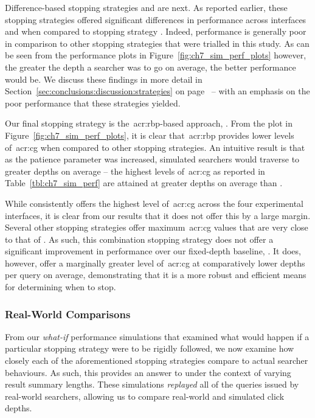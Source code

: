 Difference-based stopping strategies  and  are next. As reported earlier, these stopping strategies offered significant differences in performance across interfaces  and  when compared to stopping strategy . Indeed, performance is generally poor in comparison to other stopping strategies that were trialled in this study. As can be seen from the performance plots in Figure~\ref{fig:ch7_sim_perf_plots} however, the greater the depth a searcher was to go on average, the better performance would be. We discuss these findings in more detail in Section~\ref{sec:conclusions:discussion:strategies} on page~\pageref{sec:conclusions:discussion:strategies} -- with an emphasis on the poor performance that these strategies yielded.

Our final stopping strategy is the~\gls{acr:rbp}-based approach, . From the plot in Figure~\ref{fig:ch7_sim_perf_plots}, it is clear that~\gls{acr:rbp} provides lower levels of~\gls{acr:cg} when compared to other stopping strategies. An intuitive result is that as the patience parameter was increased, simulated searchers would traverse to greater depths on average -- the highest levels of~\gls{acr:cg} as reported in Table~\ref{tbl:ch7_sim_perf} are attained at greater depths on average than .

While  consistently offers the highest level of~\gls{acr:cg} across the four experimental interfaces, it is clear from our results that it does not offer this by a large margin. Several other stopping strategies offer maximum~\gls{acr:cg} values that are very close to that of . As such, this combination stopping strategy does not offer a significant improvement in performance over our fixed-depth baseline, . It does, however, offer a marginally greater level of~\gls{acr:cg} at comparatively lower depths per query on average, demonstrating that it is a more robust and efficient means for determining when to stop.

\subsubsection{Real-World Comparisons}\label{sec:snippets:simulations:results:comparisons}
From our \emph{what-if} performance simulations that examined what would happen if a particular stopping strategy were to be rigidly followed, we now examine how closely each of the aforementioned stopping strategies compare to actual searcher behaviours. As such, this provides an answer to  under the context of varying result summary lengths. These simulations \emph{replayed} all of the queries issued by real-world searchers, allowing us to compare real-world and simulated click depths.

